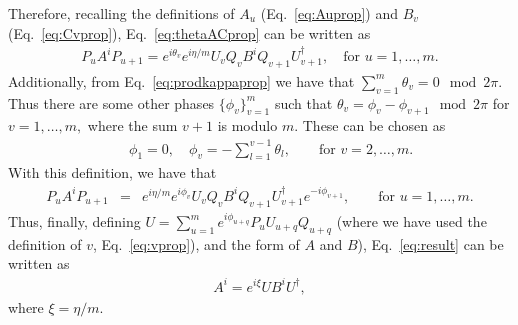 \documentclass[pra,a4paper,notitlepage,nofootinbib,superscriptaddress]{revtex4-1}
\theoremstyle{plain}
\newcommand{\1}{{\openone}}
\newcommand{\be}{\begin{eqnarray}}
\newcommand{\ee}{\end{eqnarray}}
\begin{document}
Therefore, recalling the definitions of $A_u$ (Eq.\ \eqref{eq:Auprop}) and $B_v$ (Eq.\ \eqref{eq:Cvprop}),  Eq.\ \eqref{eq:thetaACprop} can be written as
\be
    P_uA^i P_{u+1}   = e^{i\theta_v}
    e^{i\eta/m}
    U_v Q_{v} B^i Q_{v+1} U_{v+1}^{\dagger}, \quad  \textrm{for } u=1,\ldots, m.
\ee
Additionally, from Eq.\ \eqref{eq:prodkappaprop}  we have that $\sum_{v=1}^m \theta_v =0 \mod 2\pi$.
Thus there are some other phases $\{\phi_v\}_{v=1}^m$ such that
$\theta_v = \phi_v -\phi_{v+1}\mod 2\pi$ for $v=1,\ldots, m, $
where the sum $v+1$ is modulo $m$.
These can be chosen as
\be
    && \phi_1=0, \quad
    \phi_v = - \sum_{l=1}^{v-1} \theta_l,
    \qquad \textrm{for }v=2,\ldots, m.
\ee
With this definition, we have that
\be
    P_uA^i P_{u+1}
    &=& e^{i\eta/m}e^{i\phi_v}U_v Q_{v} B^i Q_{v+1} U_{v+1}^{\dagger} e^{-i\phi_{v+1}}
    , \qquad \textrm{for }u=1,\ldots, m.
    \label{eq:result}
\ee
Thus, finally, defining
$U  =  \sum_{u=1}^{m} e^{i\phi_{u+q}} P_{u}  U_{u+q} Q_{u+q}$
(where we have used the definition of $v$, Eq.\ \eqref{eq:vprop}),
and the form of $A$ and $B$), Eq.\ \eqref{eq:result} can be written as
\be
    A^i = e^{i\xi} U B^i U^\dagger,
\ee
where $\xi =\eta/m $.




\end{document}
